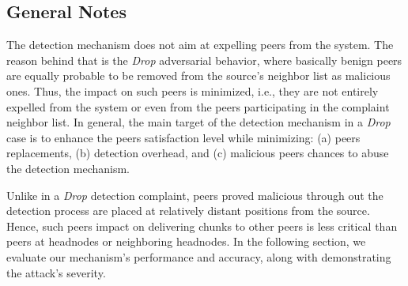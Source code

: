 \subsection{General Notes}
The detection mechanism does not aim at expelling peers from the system.
The reason behind that is the \textit{Drop} adversarial behavior, where basically benign peers are equally probable to be removed from the source's neighbor list as malicious ones.
Thus, the impact on such peers is minimized, i.e., they are not entirely expelled from the system or even from the peers participating in the complaint neighbor list.
In general, the main target of the detection mechanism in a \textit{Drop} case is to enhance the peers satisfaction level while minimizing: (a) peers replacements, (b) detection overhead, and (c) malicious peers chances to abuse the detection mechanism.

Unlike in a \textit{Drop} detection complaint, peers proved malicious through out the detection process are placed at relatively distant positions from the source.
Hence, such peers impact on delivering chunks to other peers is less critical than peers at headnodes or neighboring headnodes.
In the following section, we evaluate our mechanism's performance and accuracy, along with demonstrating the attack's severity.




